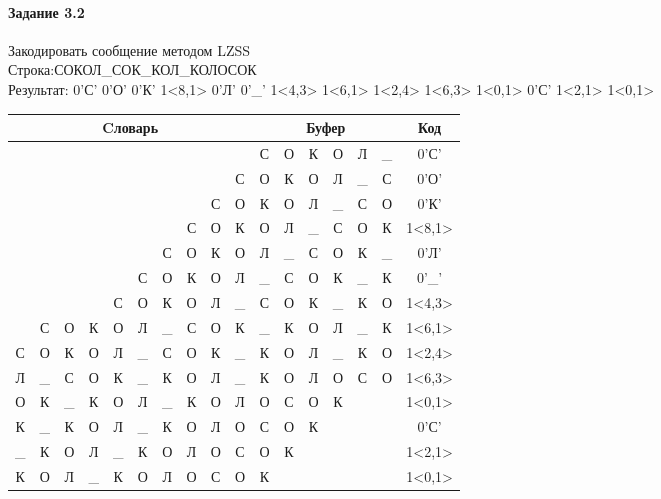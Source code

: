 \documentclass[a4paper, 12pt]{article}
\begin{document}
\paragraph{Задание 3.2}

Закодировать сообщение методом LZSS\\
Строка:СОКОЛ\_СОК\_КОЛ\_КОЛОСОК\\
Результат: 0'С' 0'О' 0'К' 1<8,1> 0'Л' 0'\_' 1<4,3> 1<6,1> 1<2,4> 1<6,3> 1<0,1> 0'С' 1<2,1> 1<0,1>\\
\begin{table}[h!]
\centering
\begin{tabular}{|c|c|c|c|c|c|c|c|c|c|c|c|c|c|c|c|c|}
\hline
\multicolumn{10}{|c|}{Cловарь} & \multicolumn{6}{c|}{Буфер} & Код  \\ \hline
  &   &   &   &   &   &   &   &   &   & С & О & К & О & Л & \_ & 0'С'\\ \hline
  &   &   &   &   &   &   &   &   & С & О & К & О & Л & \_ & С & 0'О'\\ \hline
  &   &   &   &   &   &   &   & С & О & К & О & Л & \_ & С & О & 0'К'\\ \hline
  &   &   &   &   &   &   & С & \cellcolor[HTML]{FFFF00} О & К & \cellcolor[HTML]{FFFF00} О & Л & \_ & С & О & К & 1<8,1>\\ \hline
  &   &   &   &   &   & С & О & К & О & Л & \_ & С & О & К & \_ & 0'Л'\\ \hline
  &   &   &   &   & С & О & К & О & Л & \_ & С & О & К & \_ & К & 0'\_'\\ \hline
  &   &   &   & \cellcolor[HTML]{FFFF00} С & \cellcolor[HTML]{FFFF00} О & \cellcolor[HTML]{FFFF00} К & О & Л & \_ & \cellcolor[HTML]{FFFF00} С & \cellcolor[HTML]{FFFF00} О & \cellcolor[HTML]{FFFF00} К & \_ & К & О & 1<4,3>\\ \hline
  & С & О & К & О & Л & \cellcolor[HTML]{FFFF00} \_ & С & О & К & \cellcolor[HTML]{FFFF00} \_ & К & О & Л & \_ & К & 1<6,1>\\ \hline
С & О & \cellcolor[HTML]{FFFF00} К & \cellcolor[HTML]{FFFF00} О & \cellcolor[HTML]{FFFF00} Л & \cellcolor[HTML]{FFFF00} \_ & С & О & К & \_ & \cellcolor[HTML]{FFFF00} К & \cellcolor[HTML]{FFFF00} О & \cellcolor[HTML]{FFFF00} Л & \cellcolor[HTML]{FFFF00} \_ & К & О & 1<2,4>\\ \hline
Л & \_ & С & О & К & \_ & \cellcolor[HTML]{FFFF00} К & \cellcolor[HTML]{FFFF00} О & \cellcolor[HTML]{FFFF00} Л & \_ & \cellcolor[HTML]{FFFF00} К & \cellcolor[HTML]{FFFF00} О & \cellcolor[HTML]{FFFF00} Л & О & С & О & 1<6,3>\\ \hline
\cellcolor[HTML]{FFFF00} О & К & \_ & К & О & Л & \_ & К & О & Л & \cellcolor[HTML]{FFFF00} О & С & О & К &   &   & 1<0,1>\\ \hline
К & \_ & К & О & Л & \_ & К & О & Л & О & С & О & К &   &   &   & 0'С'\\ \hline
\_ & К & \cellcolor[HTML]{FFFF00} О & Л & \_ & К & О & Л & О & С & \cellcolor[HTML]{FFFF00} О & К &   &   &   &   & 1<2,1>\\ \hline
\cellcolor[HTML]{FFFF00} К & О & Л & \_ & К & О & Л & О & С & О & \cellcolor[HTML]{FFFF00} К &   &   &   &   &   & 1<0,1>\\ \hline
\end{tabular}
\end{table}
\end{document}
